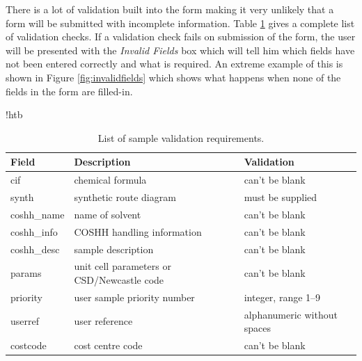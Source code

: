 \documentclass[12pt,twoside]{article}
\begin{document}
\begin{enumerate}[(i)]
There is a lot of validation built into the form making it very unlikely
that a form will be submitted with incomplete information.
Table \ref{tab:sampval} gives a complete list of
validation checks. If a validation check fails on submission of the form,
the user will be presented with the \emph{Invalid Fields} box which will
tell him which fields have not been entered correctly and what is
required. An extreme example of this is shown in Figure
\ref{fig:invalidfields} which shows what happens when none of the fields
in the form are filled-in.
\begin{table}{!htb}
\begin{center}
\begin{tabular}{lll}
\textbf{Field} & \textbf{Description} & \textbf{Validation} \\\hline
cif     &    chemical formula    &   can't be blank \\
synth   &    synthetic route diagram   &  must be supplied  \\
coshh\_name  &  name of solvent  &  can't be blank  \\
coshh\_info  &  COSHH handling information  &  can't be blank \\  
coshh\_desc  &  sample description  &  can't be blank  \\
params  &  unit cell parameters or CSD/Newcastle code  &  can't be blank \\ 
priority & user sample priority number & integer, range 1--9 \\
userref & user reference & alphanumeric without spaces \\
costcode & cost centre code & can't be blank
\end{tabular}
\caption{List of sample validation requirements.\label{tab:sampval}}
\end{center}
\end{table}


\end{enumerate}
\end{document}
